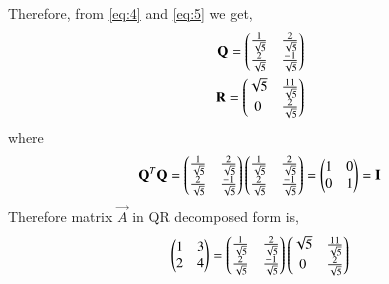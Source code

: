 \documentclass[journal,12pt,twocolumn]{IEEEtran}
\begin{document}
Therefore, from \eqref{eq:4} and \eqref{eq:5} we get,
\begin{align}
\vec{Q}= \myvec{\frac{1}{\sqrt{5}}&\frac{2}{\sqrt{5}}\\\frac{2}{\sqrt{5}}&\frac{-1}{\sqrt{5}}}\\
\Vec{R}=\myvec{\sqrt{5}&\frac{11}{\sqrt{5}}\\0&\frac{2}{\sqrt{5}}}
\end{align}
where
\begin{align}
    \vec{Q}^T\vec{Q}=\myvec{\frac{1}{\sqrt{5}}&\frac{2}{\sqrt{5}}\\\frac{2}{\sqrt{5}}&\frac{-1}{\sqrt{5}}}\myvec{\frac{1}{\sqrt{5}}&\frac{2}{\sqrt{5}}\\\frac{2}{\sqrt{5}}&\frac{-1}{\sqrt{5}}}    =\myvec{1&0\\0&1}=\Vec{I}
\end{align}
Therefore matrix $\vec{A}$ in QR decomposed form is,
\begin{align}
\begin{pmatrix}1&3\\2&4\end{pmatrix}=\begin{pmatrix}\frac{1}{\sqrt{5}}&\frac{2}{\sqrt{5}}\\\frac{2}{\sqrt{5}}&\frac{-1}{\sqrt{5}}\end{pmatrix}\begin{pmatrix}\sqrt{5}&\frac{11}{\sqrt{5}}\\0&\frac{2}{\sqrt{5}}\end{pmatrix}
\end{align}
\end{document}

